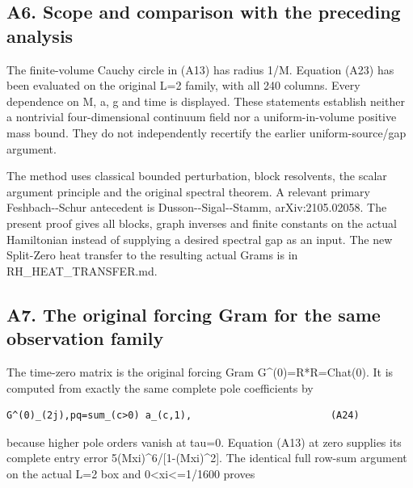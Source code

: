 \documentclass[11pt,a4paper]{article}
\renewcommand{\[}{\begingroup\small\originaldisplaystart}
\renewcommand{\]}{\originaldisplayend\endgroup}
\begin{document}
\subsection{A6. Scope and comparison with the preceding
analysis}\label{a6.-scope-and-comparison-with-the-preceding-analysis}

The finite-volume Cauchy circle in (A13) has radius 1/M. Equation (A23)
has been evaluated on the original L=2 family, with all 240 columns.
Every dependence on M, a, g and time is displayed. These statements
establish neither a nontrivial four-dimensional continuum field nor a
uniform-in-volume positive mass bound. They do not independently
recertify the earlier
{u\allowbreak{}n\allowbreak{}i\allowbreak{}f\allowbreak{}o\allowbreak{}r\allowbreak{}m\allowbreak{}-\allowbreak{}s\allowbreak{}o\allowbreak{}u\allowbreak{}r\allowbreak{}c\allowbreak{}e\allowbreak{}/\allowbreak{}g\allowbreak{}a\allowbreak{}p\allowbreak{}}
argument.

The method uses classical bounded perturbation, block resolvents, the
scalar argument principle and the original spectral theorem. A relevant
primary Feshbach-\/-Schur antecedent is Dusson-\/-Sigal-\/-Stamm,
arXiv:2105.02058. The present proof gives all blocks, graph inverses and
finite constants on the actual Hamiltonian instead of supplying a
desired spectral gap as an input. The new Split-Zero heat transfer to
the resulting actual Grams is in
{R\allowbreak{}H\allowbreak{}\_\allowbreak{}H\allowbreak{}E\allowbreak{}A\allowbreak{}T\allowbreak{}\_\allowbreak{}T\allowbreak{}R\allowbreak{}A\allowbreak{}N\allowbreak{}S\allowbreak{}F\allowbreak{}E\allowbreak{}R\allowbreak{}.\allowbreak{}m\allowbreak{}d\allowbreak{}.\allowbreak{}}

\subsection{A7. The original forcing Gram for the same observation
family}\label{a7.-the-original-forcing-gram-for-the-same-observation-family}

The time-zero matrix is the original forcing Gram G\^{}(0)=R*R=Chat(0).
It is computed from exactly the same complete pole coefficients by

\begin{verbatim}
G^(0)_(2j),pq=sum_(c>0) a_(c,1),                        (A24)
\end{verbatim}

because higher pole orders vanish at tau=0. Equation (A13) at zero
supplies its complete entry error
{5\allowbreak{}(\allowbreak{}M\allowbreak{}x\allowbreak{}i\allowbreak{})\allowbreak{}\textasciicircum{}\allowbreak{}6\allowbreak{}/\allowbreak{}[\allowbreak{}1\allowbreak{}-\allowbreak{}(\allowbreak{}M\allowbreak{}x\allowbreak{}i\allowbreak{})\allowbreak{}\textasciicircum{}\allowbreak{}2\allowbreak{}]\allowbreak{}.\allowbreak{}}
The identical full row-sum argument on the actual L=2 box and
0\textless xi\textless=1/1600 proves
\end{document}
